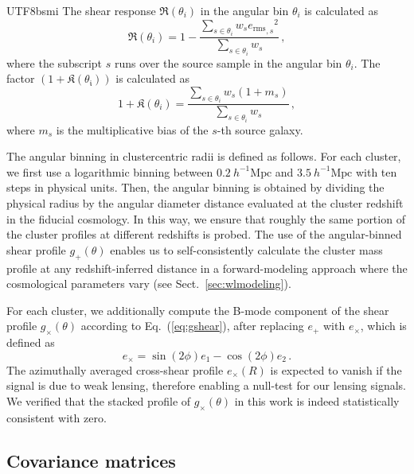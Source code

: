 \documentclass[longauth]{aa}
\newcommand{\Mpch}{\ensuremath{h^{-1}\mathrm{Mpc}}}
\newcommand{\gshear}{\ensuremath{g_{+}}}
\newcommand{\eplus}{\ensuremath{e_{+}}}
\newcommand{\gcros}{\ensuremath{g_{\times}}}
\newcommand{\ecros}{\ensuremath{e_{\times}}}
\newcommand{\lensingw}{\ensuremath{w}}
\begin{document}
\begin{CJK*}{UTF8}{bsmi}
The shear response $\mathfrak{R}(\theta_{i})$ in the angular bin $\theta_{i}$ is calculated as
%
\begin{equation}
\label{eq:response}
\mathfrak{R}(\theta_{i}) = 1 - \frac{
\sum\limits_{s\in \theta_{i}} {\lensingw}_{s} {{e_{\mathrm{rms}}}_{,s}}^2
}{
\sum\limits_{s\in \theta_{i}} {\lensingw}_{s}
}
\, ,
\end{equation}
%
where the subscript $s$ runs over the source sample in the angular bin $\theta_{i}$.
The factor $\left(1 + \mathfrak{K(\theta_{i})}\right)$ is calculated as
%
\begin{equation}
\label{eq:K}
1 + \mathfrak{K}(\theta_{i}) = \frac{
\sum\limits_{s\in \theta_{i}} {\lensingw}_{s} \left(1 + m_{s} \right)
}{
\sum\limits_{s\in \theta_{i}} {\lensingw}_{s}
}
\, ,
\end{equation}
%
where $m_{s}$ is the multiplicative bias of the $s$-th source galaxy.

The angular binning in clustercentric radii is defined as follows.
For each cluster, we first use a logarithmic binning between $0.2~\Mpch$ and $3.5~\Mpch$ with ten steps in physical units.
Then, the angular binning is obtained by dividing the physical radius by the angular diameter distance evaluated at the cluster redshift in the fiducial cosmology.
In this way, we ensure that roughly the same portion of the cluster profiles at different redshifts is probed.
The use of the angular-binned shear profile $\gshear\left(\theta\right)$ enables us to self-consistently calculate the cluster mass profile at any redshift-inferred distance in a forward-modeling approach where the cosmological parameters vary (see Sect.~\ref{sec:wlmodeling}).

For each cluster, we additionally compute the B-mode component of the shear profile $\gcros\left(\theta\right)$ according to Eq.~(\ref{eq:gshear}), after replacing $\eplus$ with $\ecros$, which is defined as
%
\begin{equation}
\label{eq:ecross}
\ecros =   \sin(2\phi) e_{1} -  \cos(2\phi) e_{2} 
\, .
\end{equation}
%
The azimuthally averaged cross-shear profile $\ecros\left(R\right)$ is expected to vanish if the signal is due to weak lensing,
therefore enabling a null-test for our lensing signals.
We verified that the stacked profile of $\gcros\left(\theta\right)$ in this work is indeed statistically consistent with zero.



\subsection{Covariance matrices}
\label{sec:covar}


\end{CJK*}
\end{document}
